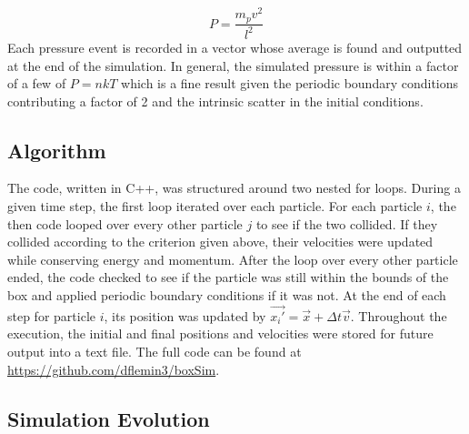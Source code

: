 \documentclass[12pt]{amsart}
\begin{document}
$$ P =  \frac{m_p v^2}{l^2}   $$
\newline
Each pressure event is recorded in a vector whose average is found and outputted at the end of the simulation.  In general, the simulated pressure is within a factor of a few of $P = nkT$ which is a fine result given the periodic boundary conditions contributing a factor of 2 and the intrinsic scatter in the initial conditions. 
\subsection{Algorithm}

The code, written in C++, was structured around two nested for loops.  During a given time step, the first loop iterated over each particle.  For each particle $i$, the then code looped over every other particle $j$ to see if the two collided.  If they collided according to the criterion given above, their velocities were updated while conserving energy and momentum.  After the loop over every other particle ended, the code checked to see if the particle was still within the bounds of the box and applied periodic boundary conditions if it was not.  At the end of each step for particle $i$, its position was updated by $\vec{x_i'} = \vec{x} + \Delta t \vec{v}$.  Throughout the execution, the initial and final positions and velocities were stored for future output into a text file.  The full code can be found at \href{https://github.com/dflemin3/boxSim}{https://github.com/dflemin3/boxSim}.

\subsection{Simulation Evolution}
\end{document}
